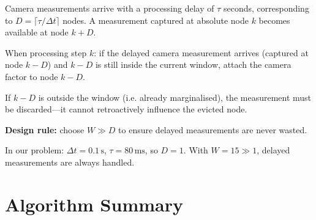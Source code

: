 \documentclass[11pt,a4paper]{article}
\newcommand{\ie}{i.e.}
\theoremstyle{definition}
\theoremstyle{plain}
\begin{document}
Camera measurements arrive with a processing delay of $\tau$ seconds,
corresponding to $D = \lceil \tau / \Delta t \rceil$ nodes.  A measurement
captured at absolute node $k$ becomes available at node $k + D$.

\begin{keybox}
  When processing step $k$: if the delayed camera measurement arrives
  (captured at node $k - D$) and $k - D$ is still inside the current
  window, attach the camera factor to node $k - D$.

  If $k - D$ is outside the window (\ie{} already marginalised), the
  measurement must be discarded—it cannot retroactively influence
  the evicted node.

  \textbf{Design rule:} choose $W \gg D$ to ensure delayed measurements
  are never wasted.
\end{keybox}

In our problem: $\Delta t = 0.1\,\text{s}$, $\tau = 80\,\text{ms}$,
so $D = 1$.  With $W = 15 \gg 1$, delayed measurements are always handled.

\section{Algorithm Summary}
\label{sec:algorithm}
\end{document}
